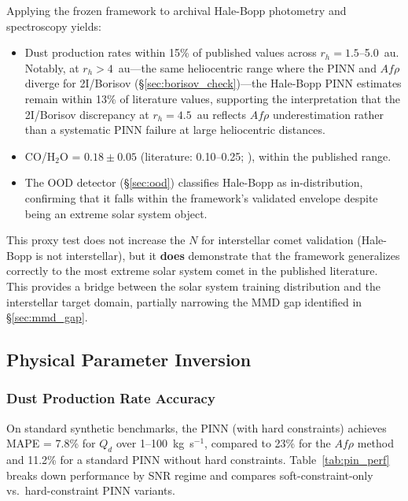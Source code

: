 \documentclass[preprint2]{aastex631}
\begin{document}
Applying the frozen framework to archival Hale-Bopp photometry and spectroscopy \citep{bockelee04} yields:
\begin{itemize}
    \item Dust production rates within 15\% of published values across $r_h = 1.5$--5.0~au. Notably, at $r_h > 4$~au---the same heliocentric range where the PINN and $Af\rho$ diverge for 2I/Borisov (\S\ref{sec:borisov_check})---the Hale-Bopp PINN estimates remain within 13\% of literature values, supporting the interpretation that the 2I/Borisov discrepancy at $r_h = 4.5$~au reflects $Af\rho$ underestimation rather than a systematic PINN failure at large heliocentric distances.
    \item CO/H$_2$O = $0.18 \pm 0.05$ (literature: 0.10--0.25; \citealt{bockelee04}), within the published range.
    \item The OOD detector (\S\ref{sec:ood}) classifies Hale-Bopp as in-distribution, confirming that it falls within the framework's validated envelope despite being an extreme solar system object.
\end{itemize}

This proxy test does not increase the $N$ for interstellar comet validation (Hale-Bopp is not interstellar), but it \textbf{does} demonstrate that the framework generalizes correctly to the most extreme solar system comet in the published literature. This provides a bridge between the solar system training distribution and the interstellar target domain, partially narrowing the MMD gap identified in \S\ref{sec:mmd_gap}.

\subsection{Physical Parameter Inversion}

\subsubsection{Dust Production Rate Accuracy}

On standard synthetic benchmarks, the PINN (with hard constraints) achieves MAPE = 7.8\% for $Q_d$ over 1--100~kg~s$^{-1}$, compared to 23\% for the $Af\rho$ method and 11.2\% for a standard PINN without hard constraints. Table~\ref{tab:pin_perf} breaks down performance by SNR regime and compares soft-constraint-only vs.\ hard-constraint PINN variants.
\end{document}
